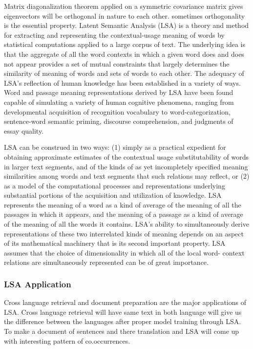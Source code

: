 \documentclass{bmcart}
\begin{document}
Matrix diagonalization theorem applied on a symmetric covariance matrix gives eigenvectors will be orthogonal in nature to each other. sometimes orthogonality is the essential property. 
Latent Semantic Analysis (LSA) is a theory and method for extracting and representing the contextual-usage meaning of words by statistical computations applied to a large corpus of text. The underlying idea is that the aggregate of all the word contexts in which a given word does and does not appear provides a set of mutual constraints that largely determines the similarity of meaning of words and sets of words to each other. The adequacy of LSA’s reflection of human knowledge has been established in a variety of ways. Word and passage meaning representations derived by LSA have been found capable of simulating a variety of human cognitive phenomena, ranging from developmental acquisition of recognition vocabulary to word-categorization, sentence-word semantic priming, discourse comprehension, and judgments of essay quality.


LSA can be construed in two ways: (1) simply as a practical expedient for obtaining approximate estimates of the contextual usage substitutability of words in larger text segments, and of the kinds of as yet incompletely specified meaning similarities among words and text segments that such relations may reflect, or (2) as a model of the computational processes and representations underlying substantial portions of the acquisition and utilization of knowledge. LSA represents the meaning of a word as a kind of average of the meaning of all the passages in which it appears, and the meaning of a passage as a kind of average of the meaning of all the words it contains. LSA's ability to simultaneously derive representations of these two interrelated kinds of meaning depends on an aspect of its mathematical machinery that is its second important property. LSA assumes that the choice of dimensionality in which all of the local word- context relations are simultaneously represented can be of great importance.

\subsubsection{LSA Application}
\label{sssec:lsaAppln}
Cross language retrieval and document preparation are the major applications of LSA. 
Cross language retrieval will have same text in both language will give us the difference between the languages after proper model training through LSA. To make a document of sentences and there translation and LSA will come up with interesting pattern of co.occurrences. 
\end{document}
